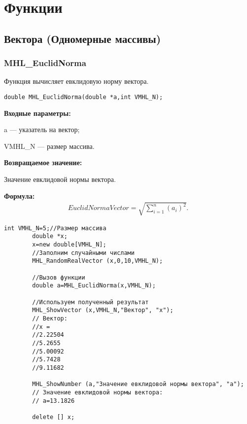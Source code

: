 \documentclass[a4paper,12pt]{article}
\begin{document}
\newpage
\section{Функции}
\subsection{Вектора (Одномерные массивы)}

\subsubsection{MHL\_EuclidNorma}\label{MHL_EuclidNorma}

Функция вычисляет евклидовую норму вектора.


\begin{lstlisting}[label=code_syntax_MHL_EuclidNorma,caption=Синтаксис]
double MHL_EuclidNorma(double *a,int VMHL_N);
\end{lstlisting}

\textbf{Входные параметры:}  

 a --- указатель на вектор;
 
 VMHL\_N ---  размер массива.
 
\textbf{Возвращаемое значение:}

 Значение евклидовой нормы вектора.

\textbf{Формула:}
\begin{eqnarray*}
EuclidNormaVector=\sqrt{\sum_{i=1}^{n} {\left( a_i\right)}^2 }.
\end{eqnarray*}


\begin{lstlisting}[label=code_use_MHL_EuclidNorma,caption=Пример использования]
        int VMHL_N=5;//Размер массива
        double *x;
        x=new double[VMHL_N];
        //Заполним случайными числами
        MHL_RandomRealVector (x,0,10,VMHL_N);

        //Вызов функции
        double a=MHL_EuclidNorma(x,VMHL_N);

        //Используем полученный результат
        MHL_ShowVector (x,VMHL_N,"Вектор", "x");
        // Вектор:
        //x =
        //2.22504
        //5.2655
        //5.00092
        //5.7428
        //9.11682

        MHL_ShowNumber (a,"Значение евклидовой нормы вектора", "a");
        // Значение евклидовой нормы вектора:
        // a=13.1826

        delete [] x;
\end{lstlisting}
\end{document}
